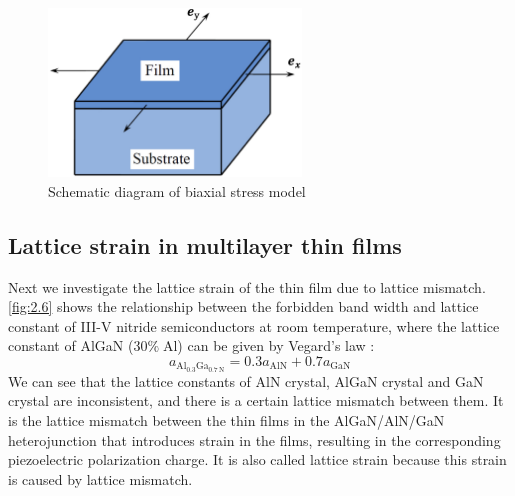 \begin{figure}[H] 
\centering    
\includegraphics[width=0.6\textwidth]{ch2_5}
\caption[Schematic diagram of biaxial stress model]{Schematic diagram of biaxial stress model}
\label{fig:2.5}
\end{figure}

\subsection{Lattice strain in multilayer thin films}
\label{sec:Lattice strain in multilayer thin films}

Next we investigate the lattice strain  of the thin film  due to  lattice mismatch. \autoref{fig:2.6} shows the relationship between the forbidden band width and lattice constant  of III-V nitride  semiconductors at room temperature, where the lattice constant  of AlGaN (30$\%\;$Al) can be given by Vegard's law  \cite{vegard1921konstitution,denton1991vegard}:
\begin{equation}
a_{\mathrm{Al}_{0.3} \mathrm{Ga}_{0.7 \mathrm{~N}}}=0.3 a_{\mathrm{AlN}}+0.7 a_{\mathrm{GaN}}
\label{eq:2.11}
\end{equation}
We can see that the lattice constants  of AlN crystal, AlGaN crystal and GaN crystal  are inconsistent, and there is a certain lattice mismatch  between them. It is the lattice mismatch between the thin films  in the  AlGaN/AlN/GaN heterojunction that introduces strain  in the films, resulting in the corresponding piezoelectric polarization charge. It is also called lattice strain  because this strain is caused by lattice mismatch.

